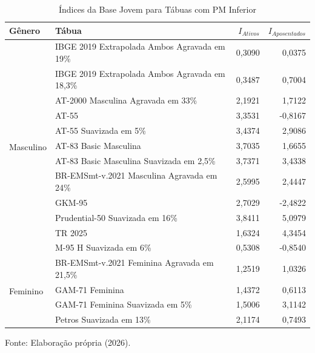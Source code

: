 \vspace{0.5cm}
\begin{table}[htbp]
    \centering
    \caption{Índices da Base Jovem para Tábuas com PM Inferior}
    \begin{threeparttable}
    \renewcommand{\arraystretch}{1.0}
    \begin{tabular}{llrr}
    \toprule
    \textbf{Gênero} & \textbf{Tábua} & \textbf{$I_{Ativos}$} & \textbf{$I_{Aposentados}$} \\ 
    \midrule
    \multirow{12}{*}{Masculino} 
        & IBGE 2019 Extrapolada Ambos Agravada em 19\% & 0,3090 & 0,0375 \\
        & IBGE 2019 Extrapolada Ambos Agravada em 18,3\% & 0,3487 & 0,7004 \\
        & AT-2000 Masculina Agravada em 33\% & 2,1921 & 1,7122 \\
        & AT-55 & 3,3531 & -0,8167 \\
        & AT-55 Suavizada em 5\% & 3,4374 & 2,9086 \\
        & AT-83 Basic Masculina & 3,7035 & 1,6655 \\
        & AT-83 Basic Masculina Suavizada em 2,5\% & 3,7371 & 3,4338 \\
        & BR-EMSmt-v.2021 Masculina Agravada em 24\% & 2,5995 & 2,4447 \\
        & GKM-95 & 2,7029 & -2,4822 \\
        & Prudential-50 Suavizada em 16\% & 3,8411 & 5,0979 \\
        & TR 2025 & 1,6324 & 4,3454 \\
        & M-95 H Suavizada em 6\% & 0,5308 & -0,8540 \\
    \hline
    \multirow{4}{*}{Feminino}
        & BR-EMSmt-v.2021 Feminina Agravada em 21,5\% & 1,2519 & 1,0326 \\
        & GAM-71 Feminina & 1,4372 & 0,6113 \\
        & GAM-71 Feminina Suavizada em 5\% & 1,5006 & 3,1142 \\
        & Petros Suavizada em 13\% & 2,1174 & 0,7493 \\
    \bottomrule
    \end{tabular}
    \begin{tablenotes}[flushleft]
        \small
        \item Fonte: Elaboração própria (2026).
    \end{tablenotes}
    \end{threeparttable}
    \label{tab:indices_jovem_pminf}
\end{table}

